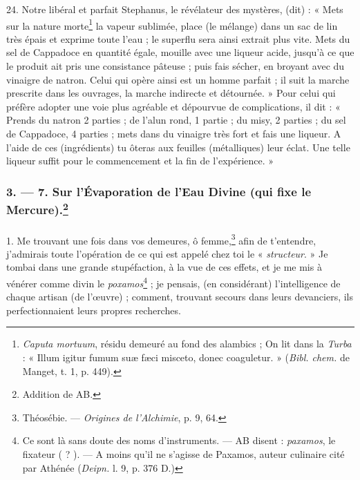 \documentclass[landscape, a4paper, 11pt, oneside, polutonikogreek, french]{article}
\begin{document}
24. Notre libéral et parfait Stephanus, le révélateur des mystères, (dit) : « Mets sur la nature morte\footnote{\emph{Caputa mortuum}, résidu demeuré au fond des alambics ; On lit dans la \emph{Turba} : « Illum igitur fumum suæ fæci misceto, donec coaguletur. » (\emph{Bibl. chem.} de Manget, t. 1, p. 449).} la vapeur sublimée, place (le mélange) dans un sac de lin très épais et exprime toute l'eau ; le superflu sera ainsi extrait plus vite. Mets du sel de Cappadoce en quantité égale, mouille avec une liqueur acide, jusqu'à ce que le produit ait pris une consistance pâteuse ; puis fais sécher, en broyant avec du vinaigre de natron. Celui qui opère ainsi est un homme parfait ; il suit la marche prescrite dans les ouvrages, la marche indirecte et détournée. » Pour celui qui préfère adopter une voie plus agréable et dépourvue de complications, il dit : « Prends du natron 2 parties ; de l'alun rond, 1 partie ; du misy, 2 parties ; du sel de Cappadoce, 4 parties ; mets dans du vinaigre très fort et fais une liqueur. A l'aide de ces (ingrédients) tu ôteras aux feuilles (métalliques) leur éclat. Une telle liqueur suffit pour le commencement et la fin de l'expérience. »

\bigskip
\centerline{\EightStarTaper}
\centerline{\EightStarTaper\EightStarTaper}
\bigskip

\subsubsection[3. --- 7. Sur l'Évaporation de l'Eau Divine (qui fixe le Mercure).]{3. --- 7. Sur l'Évaporation de l'Eau Divine (qui fixe le Mercure).\footnote{Addition de AB.}}
\paragraph{}
1. Me trouvant une fois dans vos demeures, ô femme,\footnote{Théosébie. --- \emph{Origines de l'Alchimie}, p. 9, 64.} afin de t'entendre, j'admirais toute l'opération de ce qui est appelé chez toi le « \emph{structeur}. » Je tombai dans une grande stupéfaction, à la vue de ces effets, et je me mis à vénérer comme divin le \emph{poxamos}\footnote{Ce sont là sans doute des noms d'instruments. --- AB disent : \emph{paxamos}, le fixateur ( ? ). --- A moins qu'il ne s'agisse de Paxamos, auteur culinaire cité par Athénée (\emph{Deipn.} l. 9, p. 376 D.)} ; je pensais, (en considérant) l'intelligence de chaque artisan (de l'œuvre) ; comment, trouvant secours dans leurs devanciers, ils perfectionnaient leurs propres recherches.
\end{document}
